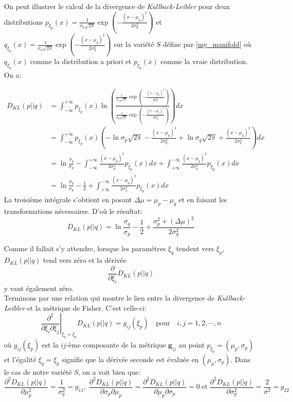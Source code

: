 \documentclass[11pt,french]{article}
\begin{document}
On peut illustrer le calcul de la divergence de \textit{Kullback-Leibler} pour deux distributions $p_{\xi_p}(x)=\frac{1}{\sigma_p\sqrt{2\pi}}\exp\left(-\frac{(x-\mu_p)^2}{2\sigma_p^2}\right)$ et $q_{\xi_q}(x)=\frac{1}{\sigma_q\sqrt{2\pi}}\exp\left(-\frac{(x-\mu_q)^2}{2\sigma_q^2}\right)$ sur la variété $S$ défine par \eqref  {my_manifold} où $q_{\xi_q}(x)$ comme la distribution a priori et $p_{\xi_p}(x)$ comme la vraie distribution. On a:

\begin{align*}
  D_{KL}(p||q)&=\int_{-\infty}^{+\infty}p_{\xi_p}(x)\ln\left(\frac{\frac{1}{\sigma_p\sqrt{2\pi}}\exp\left(-\frac{(x-\mu_p)^2}{2\sigma_p^2}\right)}{\frac{1}{\sigma_q\sqrt{2\pi}}\exp\left(-\frac{(x-\mu_q)^2}{2\sigma_q^2}\right)}\right)dx\\
  &=\int_{-\infty}^{+\infty}p_{\xi_p}(x)\left(-\ln\sigma_p\sqrt{2\pi}-\frac{(x-\mu_p)^2}{2\sigma_p^2}+\ln\sigma_q\sqrt{2\pi}+\frac{(x-\mu_q)^2}{2\sigma_q^2} \right)dx\\
  &=\ln\frac{\sigma_q}{\sigma_p}-\int_{-\infty}^{+\infty}\frac{(x-\mu_p)^2}{2\sigma_p^2}p_{\xi_p}(x)dx+\int_{+\infty}^{-\infty   }\frac{(x-\mu_q)^2}{2\sigma_q^2}p_{\xi_p}(x)dx\\
  &=\ln\frac{\sigma_q}{\sigma_p}-\frac{1}{2}+\int_{+\infty}^{-\infty   }\frac{(x-\mu_q)^2}{2\sigma_q^2}p_{\xi_p}(x)dx
\end{align*}
La troisième intégrale s'obtient en posant $\Delta\mu=\mu_p-\mu_q$ et en faisant les transformations nécessaires. D'où le résultat:
\begin{equation*}
   D_{KL}(p||q)=\ln\frac{\sigma_q}{\sigma_p}-\frac{1}{2}+\frac{\sigma_p^2+(\Delta\mu)^2}{2\sigma_q^2} 
\end{equation*}

Comme il fallait s'y attendre, lorsque les paramètres $\xi_q$ tendent vers $\xi_p$, $D_{KL}(p||q)$ tend vers zéro et la dérivée
\begin{equation*}
    \frac{\partial}{\partial\xi_i}D_{KL}(p||q)
\end{equation*}
y vaut également zéro.\\

Terminons par une relation qui montre le lien entre la divergence de \textit{Kullback-Leibler} et la métrique de Fisher. C'est celle-ci:
\begin{equation*}
    \left.\frac{\partial^2}{\partial\xi_i\partial\xi_j}\right|_{\xi_q=\xi_p}D_{KL}(p||q)=g_{ij}(\xi_p)\quad\text{pour}\quad i,j=1,2, \cdots, n
\end{equation*}
où $g_{ij}(\xi_p)$ est la $ij$-ème composante de la métrique $\textbf{g}_{ij}$ au point $p_{\xi_p}=(\mu_p, \sigma_p)$ et l'égalité $\xi_q=\xi_p$ signifie que la dérivée seconde est évaluée en $(\mu_p, \sigma_p)$. Dans le cas de notre variété $S$, on a voit bien que:
\begin{equation*}
    \frac{\partial^2D_{KL}(p||q)}{\partial\mu_p^2}=\frac{1}{\sigma_q^2}=g_{11},\;\frac{\partial^2D_{KL}(p||q)}{\partial\sigma_p\partial\mu_p}=\frac{\partial^2D_{KL}(p||q)}{\partial\mu_p\partial\sigma_p}=0\;\text{et}\;\frac{\partial^2D_{KL}(p||q)}{\partial\sigma_p^2}=\frac{2}{\sigma^2}=g_{22}
\end{equation*}\\\\


\renewcommand{\refname}{Références et bibliographie}

	
\end{document}
